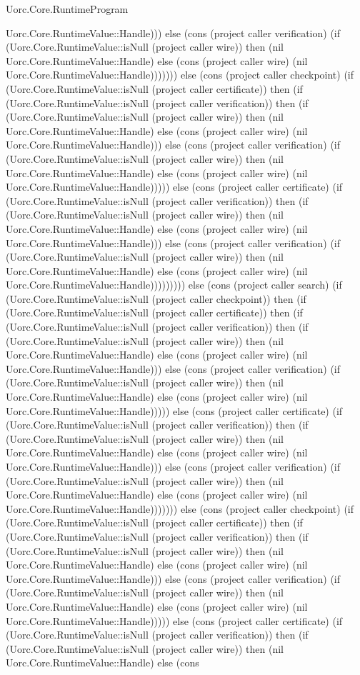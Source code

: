 \begin{lexlean}{Uorc.Core.RuntimeProgram}
\begin{semanticmodule}
{Uorc.Core.RuntimeValue::Handle))) else (cons (project caller verification) (if (Uorc.Core.RuntimeValue::isNull (project caller wire)) then (nil Uorc.Core.RuntimeValue::Handle) else (cons (project caller wire) (nil Uorc.Core.RuntimeValue::Handle))))))) else (cons (project caller checkpoint) (if (Uorc.Core.RuntimeValue::isNull (project caller certificate)) then (if (Uorc.Core.RuntimeValue::isNull (project caller verification)) then (if (Uorc.Core.RuntimeValue::isNull (project caller wire)) then (nil Uorc.Core.RuntimeValue::Handle) else (cons (project caller wire) (nil Uorc.Core.RuntimeValue::Handle))) else (cons (project caller verification) (if (Uorc.Core.RuntimeValue::isNull (project caller wire)) then (nil Uorc.Core.RuntimeValue::Handle) else (cons (project caller wire) (nil Uorc.Core.RuntimeValue::Handle))))) else (cons (project caller certificate) (if (Uorc.Core.RuntimeValue::isNull (project caller verification)) then (if (Uorc.Core.RuntimeValue::isNull (project caller wire)) then (nil Uorc.Core.RuntimeValue::Handle) else (cons (project caller wire) (nil Uorc.Core.RuntimeValue::Handle))) else (cons (project caller verification) (if (Uorc.Core.RuntimeValue::isNull (project caller wire)) then (nil Uorc.Core.RuntimeValue::Handle) else (cons (project caller wire) (nil Uorc.Core.RuntimeValue::Handle))))))))) else (cons (project caller search) (if (Uorc.Core.RuntimeValue::isNull (project caller checkpoint)) then (if (Uorc.Core.RuntimeValue::isNull (project caller certificate)) then (if (Uorc.Core.RuntimeValue::isNull (project caller verification)) then (if (Uorc.Core.RuntimeValue::isNull (project caller wire)) then (nil Uorc.Core.RuntimeValue::Handle) else (cons (project caller wire) (nil Uorc.Core.RuntimeValue::Handle))) else (cons (project caller verification) (if (Uorc.Core.RuntimeValue::isNull (project caller wire)) then (nil Uorc.Core.RuntimeValue::Handle) else (cons (project caller wire) (nil Uorc.Core.RuntimeValue::Handle))))) else (cons (project caller certificate) (if (Uorc.Core.RuntimeValue::isNull (project caller verification)) then (if (Uorc.Core.RuntimeValue::isNull (project caller wire)) then (nil Uorc.Core.RuntimeValue::Handle) else (cons (project caller wire) (nil Uorc.Core.RuntimeValue::Handle))) else (cons (project caller verification) (if (Uorc.Core.RuntimeValue::isNull (project caller wire)) then (nil Uorc.Core.RuntimeValue::Handle) else (cons (project caller wire) (nil Uorc.Core.RuntimeValue::Handle))))))) else (cons (project caller checkpoint) (if (Uorc.Core.RuntimeValue::isNull (project caller certificate)) then (if (Uorc.Core.RuntimeValue::isNull (project caller verification)) then (if (Uorc.Core.RuntimeValue::isNull (project caller wire)) then (nil Uorc.Core.RuntimeValue::Handle) else (cons (project caller wire) (nil Uorc.Core.RuntimeValue::Handle))) else (cons (project caller verification) (if (Uorc.Core.RuntimeValue::isNull (project caller wire)) then (nil Uorc.Core.RuntimeValue::Handle) else (cons (project caller wire) (nil Uorc.Core.RuntimeValue::Handle))))) else (cons (project caller certificate) (if (Uorc.Core.RuntimeValue::isNull (project caller verification)) then (if (Uorc.Core.RuntimeValue::isNull (project caller wire)) then (nil Uorc.Core.RuntimeValue::Handle) else (cons }
\end{semanticmodule}
\end{lexlean}
